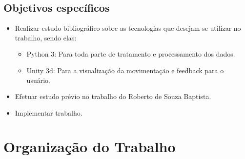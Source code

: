 \subsection{Objetivos específicos}                                              
\label{Sub:ObjetivosEspecificos}
\begin{itemize}                                                                 

\item Realizar estudo bibliográfico sobre as tecnologias que desejam-se 
utilizar no trabalho, sendo elas:
  \begin{itemize}
  \item Python 3: Para toda parte de tratamento e processamento dos dados.
  \item Unity 3d: Para a visualização da movimentação e feedback para o usuário.
  \end{itemize}                                                                     

\item Efetuar estudo prévio no trabalho do Roberto de Souza Baptista.

\item Implementar trabalho.

\end{itemize} 

\section{Organização do Trabalho}
